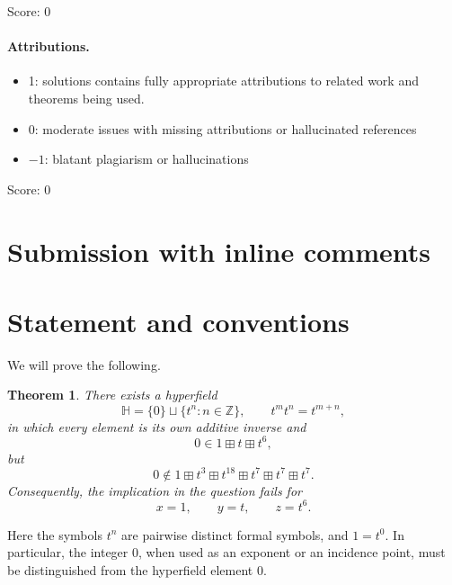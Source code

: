 \documentclass[11pt]{article}
\newcommand{\ZZ}{\mathbb{Z}}
\newcommand{\HH}{\mathbb{H}}
\newtheorem{theorem}{Theorem}
\begin{document}
\noindent Score: 0

\paragraph{Attributions.}
\begin{itemize}
	\item  1: solutions contains fully appropriate attributions
		to related work and theorems being used.
	\item  0: moderate issues with missing attributions or hallucinated references
	\item  $-1$: blatant plagiarism or hallucinations
\end{itemize}

\noindent Score: 0

\newpage
\section{Submission with inline comments}


\begin{abstract}
The proposed implication is false for general hyperfields. We construct a
countably infinite counterexample whose multiplicative group is infinite
cyclic. The construction uses an explicitly defined infinite difference set.
All required incidence properties and all hyperfield axioms are verified
directly.
\end{abstract}

\section{Statement and conventions}

We will prove the following.

\begin{theorem}\label{thm:main}
There exists a hyperfield
\[
    \HH=\{0\}\sqcup\{t^n:n\in\ZZ\},
    \qquad t^m t^n=t^{m+n},
\]
in which every element is its own additive inverse and
\[
    0\in 1\boxplus t\boxplus t^6,
\]
but
\[
    0\notin
    1\boxplus t^3\boxplus t^{18}
      \boxplus t^7\boxplus t^7\boxplus t^7.
\]
Consequently, the implication in the question fails for
\[
    x=1,\qquad y=t,\qquad z=t^6.
\]
\end{theorem}

Here the symbols \(t^n\) are pairwise distinct formal symbols, and \(1=t^0\).
In particular, the integer \(0\), when used as an exponent or an incidence
point, must be distinguished from the hyperfield element \(0\).
\end{document}
